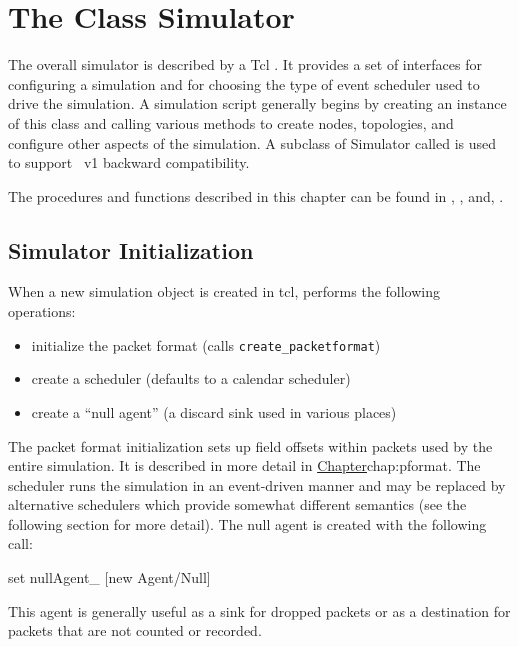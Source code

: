%
%
\chapter{The Class Simulator}
\label{chap:sim}

The overall simulator is described by a Tcl
.
It provides a set of interfaces for configuring a simulation
and for choosing the type of event scheduler used to drive
the simulation.
A simulation script generally begins by creating an instance
of this class and calling various methods to create nodes, topologies,
and configure other aspects of the simulation.
A subclass of Simulator called  is used to support
\ns~v1 backward compatibility.

The procedures and functions described in this chapter can be found in
, , and, .

\section{Simulator Initialization}
\label{sec:siminit}

When a new simulation object is created in tcl,
performs the following operations:
\begin{itemize}
        \item initialize the packet format (calls {\tt create\_packetformat})
        \item create a scheduler (defaults to a calendar scheduler)
        \item create a ``null agent'' (a discard sink used in various places)
\end{itemize}
The packet format initialization sets up field offsets within packets
used by the entire simulation.  It is described in more detail
in \href{the following chapter on packets}{Chapter}{chap:pformat}.
The scheduler runs the simulation in an event-driven manner and may
be replaced by alternative schedulers which provide somewhat
different semantics (see the following section for more detail).
The null agent is created with the following call:
\begin{program}
        set nullAgent_ [new Agent/Null]
\end{program}
This agent is generally useful as a sink for dropped packets or
as a destination for packets that are not counted or recorded.

